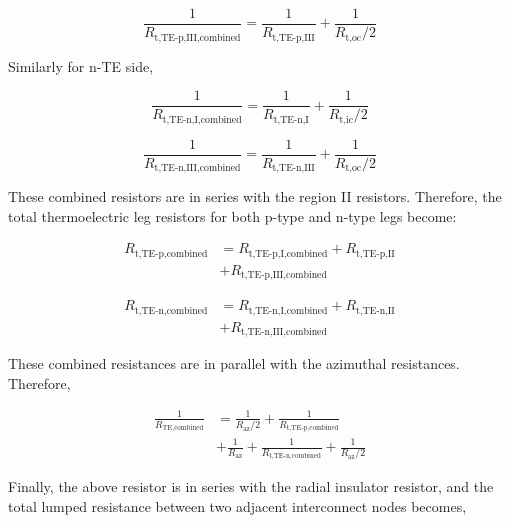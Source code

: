 \documentclass[10pt,a4paper,twocolumn]{article}
\begin{document}
\begin{equation}
	\frac{1}{R_{\text{t,TE-p,III,combined}}} = \frac{1}{R_{\text{t,TE-p,III}}} + \frac{1}{R_{\text{t,oc}}/2}
\end{equation}

Similarly for n-TE side,

\begin{equation}
	\frac{1}{R_{\text{t,TE-n,I,combined}}} = \frac{1}{R_{\text{t,TE-n,I}}} + \frac{1}{R_{\text{t,ic}}/2}
\end{equation}

\begin{equation}
	\frac{1}{R_{\text{t,TE-n,III,combined}}} = \frac{1}{R_{\text{t,TE-n,III}}} + \frac{1}{R_{\text{t,oc}}/2}
\end{equation}

These combined resistors are in series with the region II resistors. Therefore, the total thermoelectric leg resistors for both p-type and n-type legs become:

\begin{equation}
	\begin{aligned}
		R_{\text{t,TE-p,combined}} & = R_{\text{t,TE-p,I,combined}} + R_{\text{t,TE-p,II}} \\ &+ R_{\text{t,TE-p,III,combined}}
	\end{aligned}
\end{equation}

\begin{equation}
	\begin{aligned}
		R_{\text{t,TE-n,combined}} & = R_{\text{t,TE-n,I,combined}} + R_{\text{t,TE-n,II}} \\ & + R_{\text{t,TE-n,III,combined}}
	\end{aligned}
\end{equation}

These combined resistances are in parallel with the azimuthal resistances. Therefore,

\begin{equation}
	\begin{aligned}
		\frac{1}{R_{\text{TE,combined}}} & = \frac{1}{R_{\text{az}}/2} + \frac{1}{R_{\text{t,TE-p,combined}}} \\ &+ \frac{1}{R_{\text{az}}} + \frac{1}{R_{\text{t,TE-n,combined}}} +  \frac{1}{R_{\text{az}}/2}
	\end{aligned}
\end{equation}

Finally, the above resistor is in series with the radial insulator resistor, and the total lumped resistance between two adjacent interconnect nodes becomes,
\end{document}
